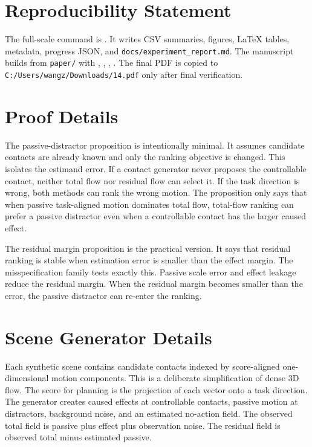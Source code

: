 \documentclass{article}
\begin{document}
\section*{Reproducibility Statement}

The full-scale command is .  It
writes CSV summaries, figures, LaTeX tables, metadata, progress JSON, and
\texttt{docs/experiment\_report.md}.  The manuscript builds from \texttt{paper/} with
, , ,
.  The final PDF is copied to
\texttt{C:/Users/wangz/Downloads/14.pdf} only after final verification.




\appendix
\renewcommand{\thesection}{\arabic{section}}

\section{Proof Details}

The passive-distractor proposition is intentionally minimal.  It assumes candidate
contacts are already known and only the ranking objective is changed.  This isolates the
estimand error.  If a contact generator never proposes the controllable contact, neither
total flow nor residual flow can select it.  If the task direction is wrong, both methods
can rank the wrong motion.  The proposition only says that when passive task-aligned
motion dominates total flow, total-flow ranking can prefer a passive distractor even when
a controllable contact has the larger caused effect.

The residual margin proposition is the practical version.  It says that residual ranking
is stable when estimation error is smaller than the effect margin.  The misspecification
family tests exactly this.  Passive scale error and effect leakage reduce the residual
margin.  When the residual margin becomes smaller than the error, the passive distractor
can re-enter the ranking.

\section{Scene Generator Details}

Each synthetic scene contains candidate contacts indexed by score-aligned one-dimensional
motion components.  This is a deliberate simplification of dense 3D flow.  The score for
planning is the projection of each vector onto a task direction.  The generator creates
caused effects at controllable contacts, passive motion at distractors, background noise,
and an estimated no-action field.  The observed total field is passive plus effect plus
observation noise.  The residual field is observed total minus estimated passive.
\end{document}
